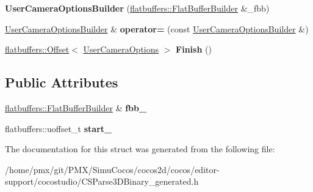 \begin{DoxyCompactItemize}
\item 
\mbox{\label{structflatbuffers_1_1UserCameraOptionsBuilder_a0791d72b12865be6a1c61c5e102d3509}} 
{\bfseries User\+Camera\+Options\+Builder} (\hyperlink{classflatbuffers_1_1FlatBufferBuilder}{flatbuffers\+::\+Flat\+Buffer\+Builder} \&\+\_\+fbb)
\item 
\mbox{\label{structflatbuffers_1_1UserCameraOptionsBuilder_a2e52b50080795b2d14309e88c65b00f8}} 
\hyperlink{structflatbuffers_1_1UserCameraOptionsBuilder}{User\+Camera\+Options\+Builder} \& {\bfseries operator=} (const \hyperlink{structflatbuffers_1_1UserCameraOptionsBuilder}{User\+Camera\+Options\+Builder} \&)
\item 
\mbox{\label{structflatbuffers_1_1UserCameraOptionsBuilder_ac3409ebba3c2e7e55b181e2cae9dc7cf}} 
\hyperlink{structflatbuffers_1_1Offset}{flatbuffers\+::\+Offset}$<$ \hyperlink{structflatbuffers_1_1UserCameraOptions}{User\+Camera\+Options} $>$ {\bfseries Finish} ()
\end{DoxyCompactItemize}
\subsection*{Public Attributes}
\begin{DoxyCompactItemize}
\item 
\mbox{\label{structflatbuffers_1_1UserCameraOptionsBuilder_a27853e2f3a9fdb50e4b5abb8052c71e3}} 
\hyperlink{classflatbuffers_1_1FlatBufferBuilder}{flatbuffers\+::\+Flat\+Buffer\+Builder} \& {\bfseries fbb\+\_\+}
\item 
\mbox{\label{structflatbuffers_1_1UserCameraOptionsBuilder_a059a3117daf406fcb1cfb99a33573054}} 
flatbuffers\+::uoffset\+\_\+t {\bfseries start\+\_\+}
\end{DoxyCompactItemize}


The documentation for this struct was generated from the following file\+:\begin{DoxyCompactItemize}
\item 
/home/pmx/git/\+P\+M\+X/\+Simu\+Cocos/cocos2d/cocos/editor-\/support/cocostudio/C\+S\+Parse3\+D\+Binary\+\_\+generated.\+h\end{DoxyCompactItemize}
